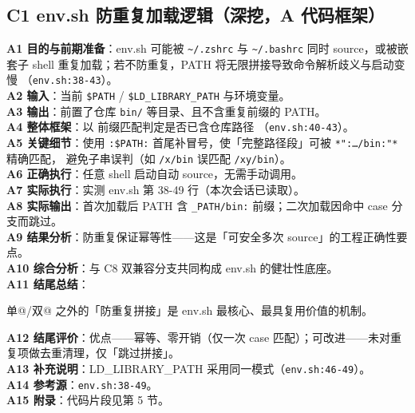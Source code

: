 \documentclass[UTF8]{ctexart}
\begin{document}
\subsection{C1 env.sh 防重复加载逻辑（深挖，A 代码框架）}
\textbf{A1 目的与前期准备}：env.sh 可能被 \texttt{\textasciitilde/.zshrc} 与 \texttt{\textasciitilde/.bashrc}
同时 source，或被嵌套子 shell 重复加载；若不防重复，PATH 将无限拼接导致命令解析歧义与启动变慢
（\texttt{\nolinkurl{env.sh:38-43}}）。\\
\textbf{A2 输入}：当前 \texttt{\$PATH} / \texttt{\$LD\_LIBRARY\_PATH} 与环境变量。\\
\textbf{A3 输出}：前置了仓库 \texttt{bin/} 等目录、且不含重复前缀的 PATH。\\
\textbf{A4 整体框架}：以 \texttt{} 前缀匹配判定是否已含仓库路径
（\texttt{\nolinkurl{env.sh:40-43}}）。\\
\textbf{A5 关键细节}：使用 \texttt{:\$PATH:} 首尾补冒号，使「完整路径段」可被 \texttt{*":\ldots/bin:"*} 精确匹配，
避免子串误判（如 \texttt{/x/bin} 误匹配 \texttt{/xy/bin}）。\\
\textbf{A6 正确执行}：任意 shell 启动自动 source，无需手动调用。\\
\textbf{A7 实际执行}：实测 env.sh 第 38-49 行（本次会话已读取）。\\
\textbf{A8 实际输出}：首次加载后 PATH 含 \texttt{\_PATH/bin:} 前缀；二次加载因命中 case 分支而跳过。\\
\textbf{A9 结果分析}：防重复保证幂等性——这是「可安全多次 source」的工程正确性要点。\\
\textbf{A10 综合分析}：与 C8 双兼容分支共同构成 env.sh 的健壮性底座。\\
\textbf{A11 结尾总结}：\begin{algobox}单@/双@ 之外的「防重复拼接」是 env.sh 最核心、最具复用价值的机制。\end{algobox}
\textbf{A12 结尾评价}：优点——幂等、零开销（仅一次 case 匹配）；可改进——未对重复项做去重清理，仅「跳过拼接」。\\
\textbf{A13 补充说明}：LD\_LIBRARY\_PATH 采用同一模式（\texttt{\nolinkurl{env.sh:46-49}}）。\\
\textbf{A14 参考源}：\texttt{\nolinkurl{env.sh:38-49}}。\\
\textbf{A15 附录}：代码片段见第 5 节。
\end{document}

